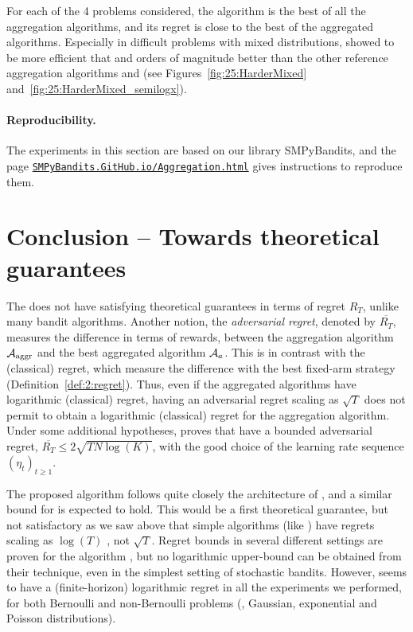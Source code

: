 For each of the 4 problems considered, the \Aggr{} algorithm  is the best of all the aggregation algorithms,
and its regret is close to the best of the aggregated algorithms.
Especially in difficult problems with mixed distributions, \Aggr{} showed to be more efficient that \ExpQ{} and orders of magnitude better than the other reference aggregation algorithms \LearnExp{} and \CORRAL{} (see Figures~\ref{fig:25:HarderMixed} and~\ref{fig:25:HarderMixed_semilogx}).


\paragraph{Reproducibility.}
%
The experiments in this section are based on our library SMPyBandits,
and the page \href{https://SMPyBandits.GitHub.io/Aggregation.html}{\texttt{SMPyBandits.GitHub.io/Aggregation.html}} gives instructions to reproduce them.


\section{Conclusion -- Towards theoretical guarantees}\label{sec:25:theory}

The \Aggr{} does not have satisfying theoretical guarantees in terms of regret $R_T$, unlike many bandit algorithms.
%
Another notion, the \emph{adversarial regret}, denoted by $\overline{R_T}$,
measures the difference in terms of rewards,
between the aggregation algorithm $\mathcal{A}_{\mathrm{aggr}}$ and the best aggregated algorithm $\mathcal{A}_a$. This is in contrast with the (classical) regret, which measure the difference with the best fixed-arm strategy (Definition~\ref{def:2:regret}).
Thus, even if the aggregated algorithms have logarithmic (classical) regret, having an adversarial regret scaling as $\sqrt{T}$ does not permit to obtain a logarithmic (classical) regret for the aggregation algorithm.
%
%
Under some additional hypotheses,
\cite[Theorem 4.2]{Bubeck12} proves that
\ExpQ{} have a bounded adversarial regret, %
$\overline{R_T} \leq 2 \sqrt{T N \log(K)}$,
with the good choice of the learning rate sequence $(\eta_t)_{t \geq 1}$.

The proposed algorithm follows quite closely the architecture of \ExpQ,
and a similar bound for \Aggr{} is expected to hold.
%
This would be a first theoretical guarantee, but not satisfactory as we saw above that simple algorithms (like \UCB) have regrets scaling as $\log(T)$ \cite{Auer02,Bubeck12}, not $\sqrt{T}$.
%
Regret bounds in several different settings are proven for the \CORRAL{} algorithm \cite{Agarwal16}, but no logarithmic upper-bound can be obtained from their technique, even in the simplest setting of stochastic bandits.
%
However, \Aggr{} seems to have a (finite-horizon) logarithmic regret in all the experiments we performed,
for both Bernoulli and non-Bernoulli problems (\eg, Gaussian, exponential and Poisson distributions).


